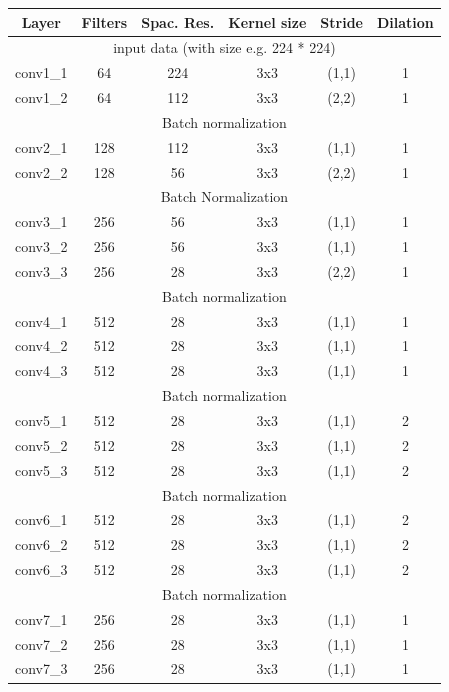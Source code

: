 \documentclass[twoside,twocolumn]{article}
\begin{document}
\begin{table}
\centering
{}
\label{tab:network}
\begin{tabular}{|c|c|c|c|c|c|}
	\hline
	\hline
	Layer & Filters & Spac. Res. & Kernel size & Stride & Dilation\\
	\hline
	\hline
	\multicolumn{6}{|c|}{input data (with size e.g. 224 * 224)}\\ \hline
	conv1\_1 & 64 & 224 & 3x3 & (1,1) & 1 \\ \hline
	conv1\_2 & 64 & 112 & 3x3 & (2,2) & 1 \\ \hline
	\multicolumn{6}{|c|}{Batch normalization}\\ \hline
	conv2\_1 & 128 & 112 & 3x3 & (1,1) & 1 \\ \hline
	conv2\_2 & 128 & 56 & 3x3 & (2,2) & 1 \\ \hline
	\multicolumn{6}{|c|}{Batch Normalization}\\ \hline
	conv3\_1 & 256 & 56 & 3x3 & (1,1) & 1 \\ \hline
	conv3\_2 & 256 & 56 & 3x3 & (1,1) & 1 \\ \hline
	conv3\_3 & 256 & 28 & 3x3 & (2,2) & 1 \\ \hline
	\multicolumn{6}{|c|}{Batch normalization}\\ \hline
	conv4\_1 & 512 & 28 & 3x3 & (1,1) & 1 \\ \hline
	conv4\_2 & 512 & 28 & 3x3 & (1,1) & 1 \\ \hline
	conv4\_3 & 512 & 28 & 3x3 & (1,1) & 1 \\ \hline
	\multicolumn{6}{|c|}{Batch normalization}\\ \hline
	conv5\_1 & 512 & 28 & 3x3 & (1,1) & 2 \\ \hline
	conv5\_2 & 512 & 28 & 3x3 & (1,1) & 2 \\ \hline
	conv5\_3 & 512 & 28 & 3x3 & (1,1) & 2 \\ \hline
	\multicolumn{6}{|c|}{Batch normalization}\\ \hline
	conv6\_1 & 512 & 28 & 3x3 & (1,1) & 2 \\ \hline
	conv6\_2 & 512 & 28 & 3x3 & (1,1) & 2 \\ \hline
	conv6\_3 & 512 & 28 & 3x3 & (1,1) & 2 \\ \hline
	\multicolumn{6}{|c|}{Batch normalization}\\ \hline
	conv7\_1 & 256 & 28 & 3x3 & (1,1) & 1 \\ \hline
	conv7\_2 & 256 & 28 & 3x3 & (1,1) & 1 \\ \hline
	conv7\_3 & 256 & 28 & 3x3 & (1,1) & 1 \\ \hline

\end{tabular}
\end{table}
\end{document}
